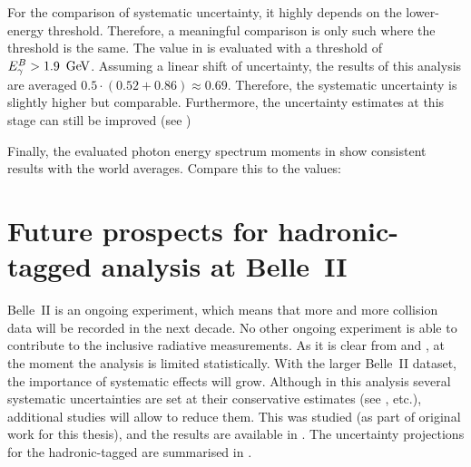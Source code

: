 For the comparison of systematic uncertainty, it highly depends on the lower-\EB energy threshold.
Therefore, a meaningful comparison is only such where the \EB threshold is the same.
The value in  is evaluated with a threshold of ${E^B_{\gamma}}>1.9~\mathrm{\,Ge\kern -0.1em V}$.
Assuming a linear shift of uncertainty, the results of this analysis are averaged $0.5\cdot(0.52+0.86)\approx0.69$.
Therefore, the systematic uncertainty is slightly higher but comparable.
Furthermore, the uncertainty estimates at this stage can still be improved
(see )

Finally, the evaluated photon energy spectrum moments in  show consistent results with the world averages.
Compare this to the values:

\section{Future prospects for hadronic-tagged \safeBtoXsgamma analysis at Belle~II}\label{sec:future_prospects}

Belle~II is an ongoing experiment, which means that more and more \epem collision data will be recorded in the next decade.
No other ongoing experiment is able to contribute to the inclusive radiative measurements.
As it is clear from  and , at the moment the analysis is limited statistically.
With the larger Belle~II dataset, the importance of systematic effects will grow.
Although in this analysis several systematic uncertainties are set at their conservative estimates (see ,  etc.),
additional studies will allow to reduce them.
This was studied (as part of original work for this thesis), and the results are available in \cite{Belle-II:2022cgf}.
The uncertainty projections for the hadronic-tagged \BtoXsgamma are summarised in .

